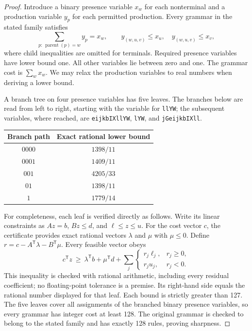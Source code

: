 \begin{proof}
Introduce a binary presence variable $x_w$ for each nonterminal and a
production variable $y_p$ for each permitted production. Every grammar
in the stated family satisfies
\[
  \sum_{p:\,\operatorname{parent}(p)=w}y_p=x_w,
  \qquad y_{(w,u,v)}\leq x_u,\quad
  y_{(w,u,v)}\leq x_v,
\]
where child inequalities are omitted for terminals. Required presence
variables have lower bound one. All other variables lie between zero and
one. The grammar cost is $\sum_w x_w$. We may relax the production
variables to real numbers when deriving a lower bound.

A branch tree on four presence variables has five leaves. The branches
below are read from left to right, starting with the variable for
\texttt{llYW}; the subsequent variables, where reached, are
\texttt{eijkbIXllYW}, \texttt{lYW}, and \texttt{jGeijkbIXll}.

\begin{center}
\begin{tabular}{cc}
Branch path & Exact rational lower bound \\
\hline
$0000$ & $1398/11$ \\
$0001$ & $1409/11$ \\
$001$  & $4205/33$ \\
$01$   & $1398/11$ \\
$1$    & $1779/14$
\end{tabular}
\end{center}

For completeness, each leaf is verified directly as follows. Write its
linear constraints as $Az=b$, $Bz\leq d$, and $\ell\leq z\leq u$.
For the cost vector $c$, the certificate provides exact rational vectors
$\lambda$ and $\mu$ with $\mu\leq0$. Define
$r=c-A^{\mathsf T}\lambda-B^{\mathsf T}\mu$. Every feasible vector obeys
\[
 c^{\mathsf T}z\ \geq\
 \lambda^{\mathsf T}b+\mu^{\mathsf T}d
 +\sum_j\begin{cases}r_j\ell_j,&r_j\geq0,\\r_ju_j,&r_j<0.\end{cases}
\]
This inequality is checked with rational arithmetic, including every
residual coefficient; no floating-point tolerance is a premise. Its
right-hand side equals the rational number displayed for that leaf.
Each bound is strictly greater than 127. The five leaves cover all
assignments of the branched binary presence variables, so every grammar
has integer cost at least 128. The original grammar is checked to belong
to the stated family and has exactly 128 rules, proving sharpness.
\end{proof}

